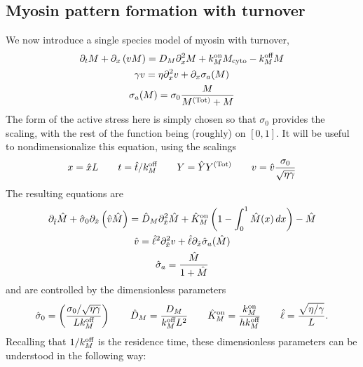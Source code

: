 \documentclass[11pt]{article}
\newcommand{\6}[1]{#1_{\text{6}}}
\newcommand{\3}[1]{#1_{\text{3}}}
\newcommand{\Tot}[1]{#1^\text{(Tot)}}
\newcommand{\My}[1]{#1_M}
\begin{document}
\subsection{Myosin pattern formation with turnover}
We now introduce a single species model of myosin with turnover, 
\begin{subequations}
\begin{gather}
\Dt M + \Dx \left(v M\right) = D_M \Dx^2 M +\My{\kon}M_\text{cyto} - \My{\koff} M \\
\label{eq:veleqndim}
\gamma v = \eta \Dx^2 v + \Dx \sigma_a(M)\\
\sigma_a(M) = \sigma_0 \frac{M}{\Tot{M}+M}
\end{gather}
\end{subequations}
The form of the active stress here is simply chosen so that $\sigma_0$ provides the scaling, with the rest of the function being (roughly) on $[0,1]$. It will be useful to nondimensionalize this equation, using the scalings
\begin{equation}
\label{eq:NDD}
x = \hat{x} L \qquad t= \hat{t}/\My{\koff} \qquad Y= \hat{Y}\Tot{Y} \qquad v = \hat{v} \frac{\sigma_0}{\sqrt{\eta \gamma}}
\end{equation}
The resulting equations are 
\begin{subequations}
\begin{gather}
\label{eq:MND}
\partial_{\hat{t}} \hat{M} +\hat{\sigma}_0  \partial_{\hat{x}} \left(\hat{v} \hat{M} \right) =\hat{D}_M \partial_{\hat{x}}^2 \hat{M} +\hat{K}^\text{on}_M \left(1-\int_0^1  \hat{M}(x) \, dx\right) - \hat{M}\\
\label{eq:MVND}
\hat{v} = \hat{\ell}^2 \partial_{\hat{x}}^2 v +\hat{\ell} \partial_{\hat{x}} \hat{\sigma}_a(\hat{M})\\
\hat{\sigma}_a = \frac{\hat{M}}{1+\hat{M}}
 \end{gather}
\end{subequations}
and are controlled by the dimensionless parameters
\begin{equation}
\label{eq:NDparams}
\hat{\sigma}_0 = \left(\frac{\sigma_0/ \sqrt{\eta \gamma} }{L \My{\koff}}\right)   \qquad \hat{D}_M =\frac{D_M}{\My{\koff}  L^2} \qquad \hat{K}^\text{on}_M= \frac{\My{\kon}}{h \My{\koff}} \qquad \hat{\ell} = \frac{\sqrt{\eta/\gamma}}{L}.
\end{equation}
Recalling that $1/\My{\koff}$ is the residence time, these dimensionless parameters can be understood in the following way: 
\end{document}
